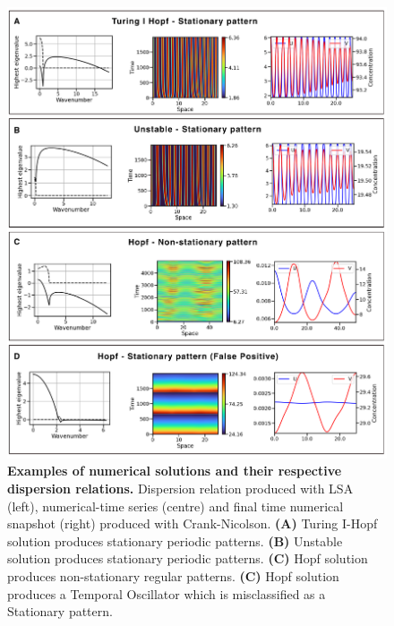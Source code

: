 \begin{figure}[H] %
    \centering
    \begin{adjustbox}{center}
        \includegraphics[width=1\textwidth]{chapters/Chapter 1/interesting_cases_nogrowth} %
    \end{adjustbox}
    \caption{\textbf{Examples of numerical solutions and their respective dispersion relations.} Dispersion relation produced with LSA (left), numerical-time series (centre) and final time numerical snapshot (right) produced with Crank-Nicolson. \textbf{(A)} Turing I-Hopf solution produces stationary periodic patterns. \textbf{(B)} Unstable solution produces stationary periodic patterns. \textbf{(C)} Hopf solution produces non-stationary regular patterns. \textbf{(C)} Hopf solution produces a Temporal Oscillator which is misclassified as a Stationary pattern.}
    \label{fig:interesting_cases_nogrowth} %
\end{figure}

